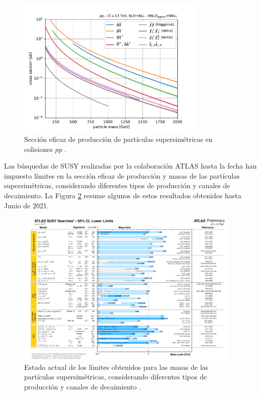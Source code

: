 \begin{figure}
  \centering
  \includegraphics[width=0.8\textwidth]{images/theory/SUSY_xsecs_13TeV_overview.pdf}
  \caption{Sección eficaz de producción de partículas supersimétricas en colisiones $pp$ \cite{susy_xs}.}
  \label{fig:susy_xs}
\end{figure}


Las búsquedas de SUSY realizadas por la colaboración ATLAS hasta la fecha han impuesto límites en la sección eficaz de producción y masas de las partículas supersimétricas, considerando diferentes tipos de producción y canales de decaimiento. La Figura \ref{fig:susy_xs_limits} resume algunos de estos resultados obtenidos hasta Junio de 2021.


\begin{figure}
	\centering
  \includegraphics[width=0.95\textwidth]{images/theory/susy_xs_limits.pdf}
  \caption{Estado actual de los límites obtenidos para las masas de las partículas supersimétricas, considerando diferentes tipos de producción y canales de decaimiento \cite{susy_xs_limits}.}
  \label{fig:susy_xs_limits}
\end{figure}
